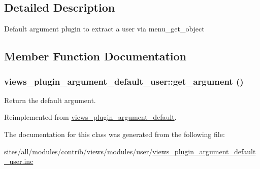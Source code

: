 \subsection{Detailed Description}
Default argument plugin to extract a user via menu\_\-get\_\-object 

\subsection{Member Function Documentation}
\hypertarget{classviews__plugin__argument__default__user_f7dc56a3ce8a8cf8ad12595952dc70e6}{
\subsubsection[{get\_\-argument}]{\setlength{\rightskip}{0pt plus 5cm}views\_\-plugin\_\-argument\_\-default\_\-user::get\_\-argument ()}}
\label{classviews__plugin__argument__default__user_f7dc56a3ce8a8cf8ad12595952dc70e6}


Return the default argument. 

Reimplemented from \hyperlink{classviews__plugin__argument__default_8e67864f4a1ce20b12bc82afe1acd255}{views\_\-plugin\_\-argument\_\-default}.

The documentation for this class was generated from the following file:\begin{CompactItemize}
\item 
sites/all/modules/contrib/views/modules/user/\hyperlink{views__plugin__argument__default__user_8inc}{views\_\-plugin\_\-argument\_\-default\_\-user.inc}\end{CompactItemize}
